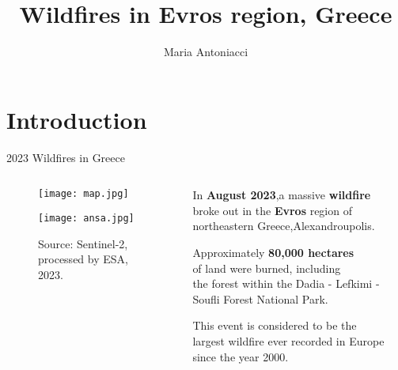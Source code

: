 \documentclass{beamer} %
\title{Wildfires in Evros region, Greece}
\author{Maria Antoniacci}
\institute{Scienze e Gestione della Natura - Unibo}
\begin{document}
\maketitle 


\section{Introduction} %

\begin{frame}{2023 Wildfires in Greece}

\begin{columns} %

    \begin{column}{0.65\textwidth}
    \begin{figure}
    \centering
    \texttt{[image: map.jpg]}
   \end{figure}
   
    \begin{figure}
    \centering
    \texttt{[image: ansa.jpg]}
    
    {\tiny{Source: Sentinel-2, processed by ESA, 2023.}}
   \end{figure}  
    \end{column}

    \begin{column}{0.5\textwidth}
        \scriptsize In \textbf{August 2023},a massive \textbf{wildfire}\\ broke out in the \textbf{Evros} region of northeastern Greece,\reaching Alexandroupolis.
        
        \bigskip
        Approximately \textbf{80,000 hectares}\\ of land were burned, including\\ the forest within the Dadia - Lefkimi - Soufli Forest National Park.
        
        \bigskip
        This event is considered to be the\\ largest wildfire ever recorded in Europe since the year 2000. 
       
    \end{column}
    
\end{columns}

\end{frame}
\end{document}
